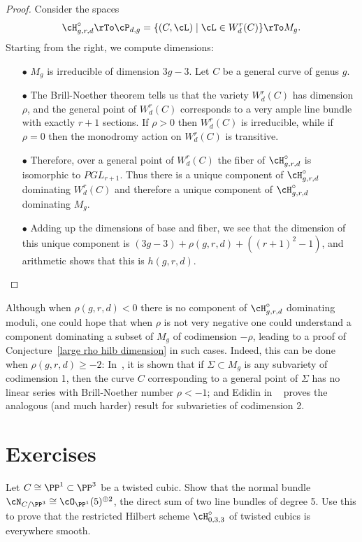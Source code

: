 \begin{proof}
Consider the spaces
$$
\cH^\circ_{g,r,d}  
\rTo 
\cP_{d,g} = \{(C,\cL) \mid \cL \in W^r_d(C) \} 
\rTo 
M_g.
$$
Starting from the right, we compute dimensions:

\begin{enumerate}

\item[$\bullet$]  $M_g$ is irreducible of dimension $3g-3$. Let $C$ be a general curve of genus $g$.

\item[$\bullet$]  
The Brill-Noether theorem tells us that the variety $W^r_d(C)$ has dimension $\rho$, and the general point of $W^r_d(C)$ corresponds to a very ample line bundle with exactly $r+1$ sections. 
If $\rho>0$ then $W^r_d(C)$ is irreducible, while if $\rho = 0$ then the monodromy action on $W^r_d(C)$
is transitive.

\item[$\bullet$] Therefore, over a general point of $W^r_d(C)$ the fiber of $\cH^\circ_{g,r,d} $ is
isomorphic to $PGL_{r+1}$. Thus there is a unique component of $\cH^\circ_{g,r,d}$ dominating
$W^r_d(C)$ and therefore a unique component of $\cH^\circ_{g,r,d}$ dominating $M_g$.

\item[$\bullet$] Adding up the dimensions of base and fiber, we see that the dimension
of this unique component is $(3g-3)+\rho(g,r,d) +((r+1)^2-1)$,
and arithmetic shows that this is $h(g,r,d)$.
\end{enumerate}
\end{proof}

\begin{fact}\label{Hilb with rho geq -2}
 Although when $\rho(g,r,d)<0$ there is no component of $\cH^{\circ}_{g,r,d}$ dominating moduli, one could hope
that when $\rho$ is not very negative one could understand a component dominating a subset of $M_{g}$ of codimension $-\rho$, leading to a proof of Conjecture~\ref{large rho hilb dimension} in such cases.
Indeed, this can be done when $\rho(g,r,d)\geq -2$: In~\cite{BrillNoether-1}, it is shown that if $\Sigma \subset M_g$ is any subvariety of codimension 1, then the curve $C$ corresponding to a general point of $\Sigma$ has no linear series with Brill-Noether number $\rho < -1$; and Edidin in ~\cite{Edidin} proves the analogous (and much harder) result for subvarieties of codimension 2.
\end{fact}


\section{Exercises}
\begin{exercise}\label{twisted cubic normal bundle}
Let $C \cong \PP^1 \subset \PP^3$ be a twisted cubic. Show that the normal bundle $\cN_{C/\PP^3} \cong \cO_{\PP^1}(5)^{\oplus 2}$, the direct sum of two line bundles of degree 5. Use this to prove that the restricted Hilbert scheme $\cH^\circ_{0,3,3}$ of twisted cubics is everywhere smooth. \end{exercise}

